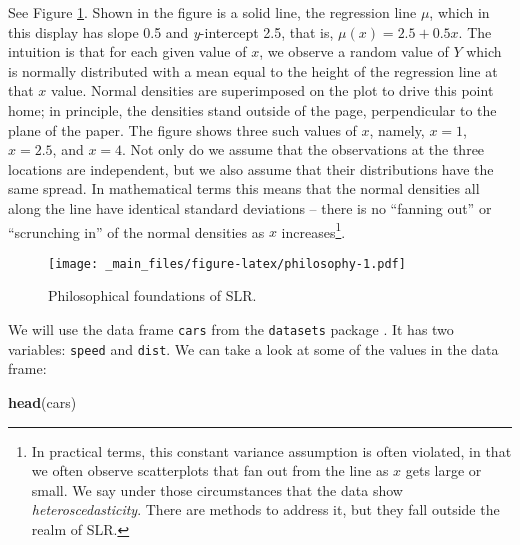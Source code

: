 \documentclass[]{book}
\newenvironment{Shaded}{\begin{snugshade}}{\end{snugshade}}
\newcommand{\KeywordTok}[1]{\textcolor[rgb]{0.13,0.29,0.53}{\textbf{{#1}}}}
\newcommand{\NormalTok}[1]{{#1}}
\let\rmarkdownfootnote\footnote%
\def\footnote{\protect\rmarkdownfootnote}
\numberwithin{equation}{chapter}
\numberwithin{figure}{chapter}
\theoremstyle{plain}
\theoremstyle{definition}
\theoremstyle{remark}
\theoremstyle{definition}
\theoremstyle{definition}
\theoremstyle{remark}
\let\BeginKnitrBlock\begin \let\EndKnitrBlock\end
\begin{document}
See Figure \ref{fig:philosophy}. Shown in the figure is a solid line,
the regression line  \(\mu\), which in this
display has slope 0.5 and \emph{y}-intercept 2.5, that is,
\(\mu(x)=2.5 + 0.5x\). The intuition is that for each given value of
\(x\), we observe a random value of \(Y\) which is normally distributed
with a mean equal to the height of the regression line at that \(x\)
value. Normal densities are superimposed on the plot to drive this point
home; in principle, the densities stand outside of the page,
perpendicular to the plane of the paper. The figure shows three such
values of \(x\), namely, \(x = 1\), \(x = 2.5\), and \(x = 4\). Not only
do we assume that the observations at the three locations are
independent, but we also assume that their distributions have the same
spread. In mathematical terms this means that the normal densities all
along the line have identical standard deviations -- there is no
``fanning out'' or ``scrunching in'' of the normal densities as \(x\)
increases\footnote{In practical terms, this constant variance assumption
  is often violated, in that we often observe scatterplots that fan out
  from the line as \(x\) gets large or small. We say under those
  circumstances that the data show \emph{heteroscedasticity}. There are
  methods to address it, but they fall outside the realm of SLR.}.

\begin{figure}[htbp]
\centering
\texttt{[image: \_main\_files/figure-latex/philosophy-1.pdf]}
\caption{\label{fig:philosophy}\small Philosophical foundations of SLR.}
\end{figure}



\bigskip

\BeginKnitrBlock{example}[Speed and stopping distance of cars]
\protect\hypertarget{ex:unnamed-chunk-454}{}{\label{ex:unnamed-chunk-454}
\iffalse (Speed and stopping distance of cars) \fi }We will use the data
frame \texttt{cars}  from the \texttt{datasets} package
\autocite{datasets}. It has two variables: \texttt{speed} and
\texttt{dist}. We can take a look at some of the values in the data
frame:
\EndKnitrBlock{example}

\begin{Shaded}
\begin{Highlighting}[]
\KeywordTok{head}\NormalTok{(cars)}
\end{Highlighting}
\end{Shaded}
\end{document}
